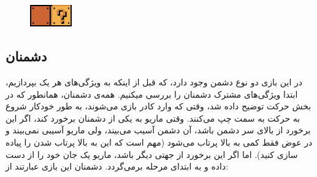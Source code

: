 \documentclass{utap}
\begin{document}
\begin{itemize}
\begin{itemize}
\begin{minipage}{.7\textwidth}
\end{minipage}
\begin{minipage}{.15\textwidth}
\begin{figure}[H]
	\begin{center}
		\includegraphics[width=1.8cm]{magicBricks}
	\end{center}
\end{figure}
\end{minipage}

		\end{itemize}
	\end{itemize}


	\subsection{دشمنان}
در این بازی دو نوع دشمن وجود دارد، که قبل از اینکه به ویژگی‌های هر یک بپردازیم، ابتدا ویژگی‌های مشترک دشمنان را بررسی میکنیم.
همه‌ی دشمنان، همانطور که در بخش حرکت توضیح داده شد، وقتی که وارد کادر بازی می‌شوند، به طور خودکار شروع به حرکت به سمت چپ می‌کنند.
وقتی ماریو به یکی از دشمنان برخورد کند، اگر این برخورد از بالای سر دشمن باشد، آن دشمن آسیب می‌بیند، ولی ماریو آسیبی نمی‌بیند و در عوض فقط کمی به بالا پرتاب می‌شود (مهم است که این به بالا پرتاب شدن را پیاده سازی کنید). اما اگر این برخورد از جهتی دیگر باشد، ماریو یک جان خود را از دست داده و به ابتدای مرحله برمی‌گردد. دشمنان این بازی عبارتند از:
\end{document}
